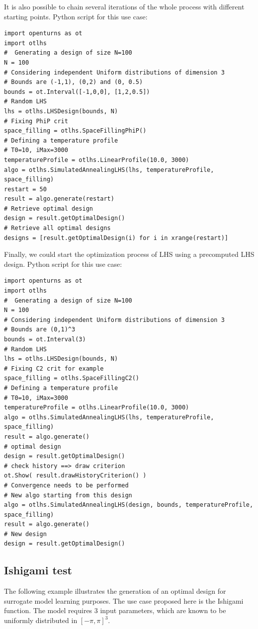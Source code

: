It is also possible to chain several iterations of the whole process with different starting points.
Python script for this use case:
\begin{lstlisting}
import openturns as ot
import otlhs
#  Generating a design of size N=100
N = 100
# Considering independent Uniform distributions of dimension 3
# Bounds are (-1,1), (0,2) and (0, 0.5)
bounds = ot.Interval([-1,0,0], [1,2,0.5])
# Random LHS
lhs = otlhs.LHSDesign(bounds, N)
# Fixing PhiP crit
space_filling = otlhs.SpaceFillingPhiP()
# Defining a temperature profile
# T0=10, iMax=3000
temperatureProfile = otlhs.LinearProfile(10.0, 3000)
algo = otlhs.SimulatedAnnealingLHS(lhs, temperatureProfile, space_filling)
restart = 50
result = algo.generate(restart)
# Retrieve optimal design
design = result.getOptimalDesign()
# Retrieve all optimal designs
designs = [result.getOptimalDesign(i) for i in xrange(restart)]
\end{lstlisting}

Finally, we could start the optimization process of LHS using a precomputed LHS design.
Python script for this use case:
\begin{lstlisting}
import openturns as ot
import otlhs
#  Generating a design of size N=100
N = 100
# Considering independent Uniform distributions of dimension 3
# Bounds are (0,1)^3
bounds = ot.Interval(3)
# Random LHS
lhs = otlhs.LHSDesign(bounds, N)
# Fixing C2 crit for example
space_filling = otlhs.SpaceFillingC2()
# Defining a temperature profile
# T0=10, iMax=3000
temperatureProfile = otlhs.LinearProfile(10.0, 3000)
algo = otlhs.SimulatedAnnealingLHS(lhs, temperatureProfile, space_filling)
result = algo.generate()
# optimal design
design = result.getOptimalDesign()
# check history ==> draw criterion
ot.Show( result.drawHistoryCriterion() )
# Convergence needs to be performed
# New algo starting from this design
algo = otlhs.SimulatedAnnealingLHS(design, bounds, temperatureProfile, space_filling)
result = algo.generate()
# New design
design = result.getOptimalDesign()
\end{lstlisting}


\subsection{Ishigami test}
The following example illustrates the generation of an optimal design for surrogate model learning purposes.
The use case proposed here is the Ishigami function. The model requires $3$ input parameters, which are known to be
uniformly distributed in $[-\pi,\pi]^3$.\\

